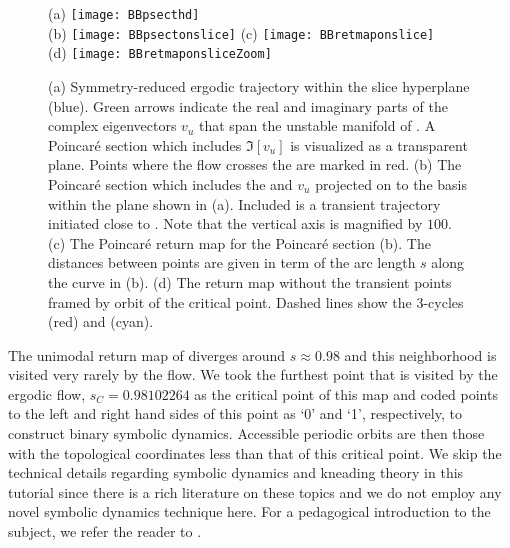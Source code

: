 {\begin{figure}
\centering
  (a) \texttt{[image: BBpsecthd]} \\
  (b) \texttt{[image: BBpsectonslice]}
  (c) \texttt{[image: BBretmaponslice]} \\
  (d) \texttt{[image: BBretmaponsliceZoom]}
\caption{(a) Symmetry-reduced ergodic trajectory within the slice hyperplane (blue).
			Green arrows indicate the real and imaginary parts of the complex eigenvectors
			$v_u$ that span the unstable manifold of \REQV{}{}. A Poincar\'e section which includes
			$\Im[v_u]$ is visualized as a transparent plane. Points where the flow crosses
			the are marked in red.
		 (b) The Poincar\'e section which includes the \REQV{}{} and $v_u$ projected
			on to the basis within the plane shown in (a). Included is a
            transient trajectory initiated close to \REQV{}{}. Note that
		  	the vertical axis is magnified by $100$.
		 (c) The Poincar\'e return map for the Poincar\'e section (b). The distances between points
		are given in term of the arc length $s$ along the curve in (b).
		 (d) The return map without the transient points framed by
            orbit of the critical point.
		 	Dashed lines show the 3-cycles  (red) and  (cyan).}
\label{fig:psectandretmap}
\end{figure}

The unimodal return map of  diverges around
$s \approx 0.98$ and this neighborhood is visited very rarely by the flow. We
took the furthest point that is visited by the ergodic flow, $s_C=0.98102264$
as the critical point of this map and coded points to the left and right hand sides of this
point as `0' and `1', respectively, to construct binary symbolic dynamics.
Accessible periodic orbits are then those with the topological coordinates
less than that of this critical point. We skip the technical details
regarding symbolic dynamics and kneading theory in this tutorial since
there is a rich literature on these topics and we do not employ any novel
symbolic dynamics technique here. For a pedagogical introduction to the
subject, we refer the reader to .

}
